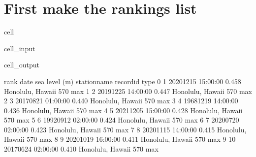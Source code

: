 \documentclass[letterpaper,10pt,english]{jupyterBook}
\begin{document}
\section{First make the rankings list}
\label{\detokenize{notebooks/regional_and_local/SL_Extremes_annual:first-make-the-rankings-list}}
\begin{sphinxuseclass}{cell}\begin{sphinxVerbatimInput}

\begin{sphinxuseclass}{cell_input}
\begin{sphinxVerbatim}[commandchars=\\\{\}]
  
  
\PYG{p}{[}\PYG{p}{]}  \PYG{p}{[}\PYG{p}{]}
  

  \PYG{p}{[}\PYG{p}{[}\PYG{p}{]}\PYG{p}{]}
\end{sphinxVerbatim}

\end{sphinxuseclass}\end{sphinxVerbatimInput}
\begin{sphinxVerbatimOutput}

\begin{sphinxuseclass}{cell_output}
\begin{sphinxVerbatim}[commandchars=\\\{\}]
   rank                date  sea level (m)      station\PYGZus{}name record\PYGZus{}id type
0     1 2020\PYGZhy{}12\PYGZhy{}15 15:00:00          0.458  Honolulu, Hawaii       570  max
1     2 2019\PYGZhy{}12\PYGZhy{}25 14:00:00          0.447  Honolulu, Hawaii       570  max
2     3 2017\PYGZhy{}08\PYGZhy{}21 01:00:00          0.440  Honolulu, Hawaii       570  max
3     4 1968\PYGZhy{}12\PYGZhy{}19 14:00:00          0.436  Honolulu, Hawaii       570  max
4     5 2021\PYGZhy{}12\PYGZhy{}05 15:00:00          0.428  Honolulu, Hawaii       570  max
5     6 1992\PYGZhy{}09\PYGZhy{}12 02:00:00          0.424  Honolulu, Hawaii       570  max
6     7 2020\PYGZhy{}07\PYGZhy{}20 02:00:00          0.423  Honolulu, Hawaii       570  max
7     8 2020\PYGZhy{}11\PYGZhy{}15 14:00:00          0.415  Honolulu, Hawaii       570  max
8     9 2020\PYGZhy{}10\PYGZhy{}19 16:00:00          0.411  Honolulu, Hawaii       570  max
9    10 2017\PYGZhy{}06\PYGZhy{}24 02:00:00          0.410  Honolulu, Hawaii       570  max
\end{sphinxVerbatim}


\end{sphinxuseclass}
\end{sphinxVerbatimOutput}
\end{sphinxuseclass}
\end{document}
